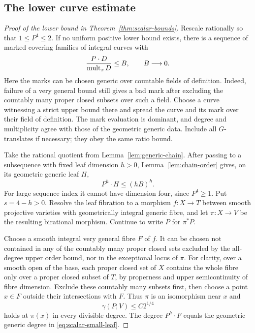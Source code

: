 \subsection{The lower curve estimate}

\begin{proof}[Proof of the lower bound in Theorem~\ref{thm:scalar-bounds}]
Rescale rationally so that $1\le P^4\le2$.  If no uniform positive
lower bound exists, there is a sequence of marked covering families
of integral curves with
\[
 \frac{P\cdot D}{\operatorname{mult}_xD}\le B,
 \qquad B\longrightarrow0.
\]
Here the marks can be chosen generic over countable fields of
definition.  Indeed, failure of a very general bound still gives a
bad mark after excluding the countably many proper closed subsets
over such a field.  Choose a curve witnessing a strict upper bound
there and spread the curve and its mark over their field of definition.
The mark evaluation is dominant, and degree and multiplicity agree
with those of the geometric generic data.  Include all $G$-translates
if necessary; they obey the same ratio bound.

Take the rational quotient from Lemma~\ref{lem:generic-chain}.
After passing to a subsequence with fixed leaf dimension $h>0$,
Lemma~\ref{lem:chain-order} gives, on its geometric generic leaf $H$,
\begin{equation}\label{eq:scalar-small-leaf}
 P^h\cdot H\le(hB)^h.
\end{equation}
For large sequence index it cannot have dimension four, since
$P^4\ge1$.  Put $s=4-h>0$.  Resolve the leaf fibration to a morphism
$f:X\to T$ between smooth projective varieties with geometrically
integral generic fibre, and let $\pi:X\to V$ be the resulting
birational morphism.  Continue to write $P$ for $\pi^*P$.

Choose a smooth integral very general fibre $F$ of $f$.  It can be
chosen not contained in any of the countably many proper closed sets
excluded by the all-degree upper order bound, nor in the exceptional
locus of $\pi$.  For clarity, over a smooth open of the base, each
proper closed set of $X$ contains the whole fibre only over a proper
closed subset of $T$, by properness and upper semicontinuity of fibre
dimension.  Exclude these countably many subsets first, then choose
a point $x\in F$ outside their intersections with $F$.  Thus $\pi$
is an isomorphism near $x$ and
\begin{equation}\label{eq:scalar-point-upper}
 \gamma(P;V)\le C2^{1/4}
\end{equation}
holds at $\pi(x)$ in every divisible degree.  The degree
$P^h\cdot F$ equals the geometric generic degree in
\eqref{eq:scalar-small-leaf}.


\end{proof}
